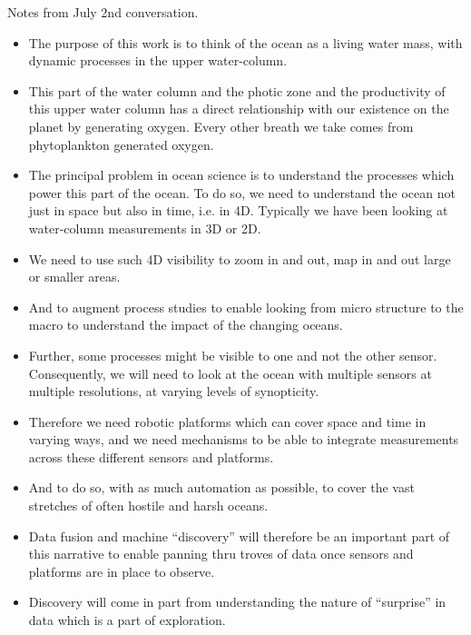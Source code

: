 Notes from July 2nd conversation.

\begin{itemize}[noitemsep,topsep=0pt,parsep=0pt,partopsep=0pt]

\item The purpose of this work is to think of the ocean as a living
  water mass, with dynamic processes in the upper water-column.

\item This part of the water column and the photic zone and the
  productivity of this upper water column has a direct relationship with
  our existence on the planet by generating oxygen. Every other breath
  we take comes from phytoplankton generated oxygen.

\item The principal problem in ocean science is to understand the
  processes which power this part of the ocean. To do so, we need to
  understand the ocean not just in space but also in time, i.e. in
  4D. Typically we have been looking at water-column measurements in 3D
  or 2D.

\item We need to use such 4D visibility to zoom in and out, map in and
  out large or smaller areas.

\item And to augment process studies to enable looking from micro
  structure to the macro to understand the impact of the changing
  oceans.

\item Further, some processes might be visible to one and not the other
  sensor. Consequently, we will need to look at the ocean with multiple
  sensors at multiple resolutions, at varying levels of synopticity.

\item Therefore we need robotic platforms which can cover space and time
  in varying ways, and we need mechanisms to be able to integrate
  measurements across these different sensors and platforms.

\item And to do so, with as much automation as possible, to cover the
  vast stretches of often hostile and harsh oceans.

\item Data fusion and machine ``discovery'' will therefore be an
  important part of this narrative to enable panning thru troves of data
  once sensors and platforms are in place to observe.

\item Discovery will come in part from understanding the nature of
  ``surprise'' in data which is a part of exploration.


\end{itemize}
